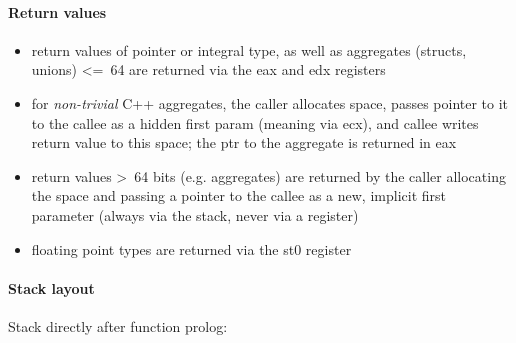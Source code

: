 \clearpage

\paragraph{Return values}

\begin{itemize}
\item return values of pointer or integral type, as well as aggregates (structs, unions) \textless=\ 64 are returned via the eax and edx registers
\item for {\it non-trivial} C++ aggregates, the caller allocates space, passes pointer to it to the callee as a hidden first param
(meaning via ecx), and callee writes return value to this space; the ptr to the aggregate is returned in eax
\item return values \textgreater\ 64 bits (e.g. aggregates) are returned by the caller allocating the space and
passing a pointer to the callee as a new, implicit first parameter (always via the stack, never via a register)
\item floating point types are returned via the st0 register
\end{itemize}


\paragraph{Stack layout}

Stack directly after function prolog:\\

